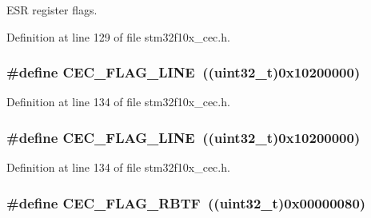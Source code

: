 E\+SR register flags. 



Definition at line 129 of file stm32f10x\+\_\+cec.\+h.

\subsubsection[{\texorpdfstring{C\+E\+C\+\_\+\+F\+L\+A\+G\+\_\+\+L\+I\+NE}{CEC_FLAG_LINE}}]{\setlength{\rightskip}{0pt plus 5cm}\#define C\+E\+C\+\_\+\+F\+L\+A\+G\+\_\+\+L\+I\+NE~(({\bf uint32\+\_\+t})0x10200000)}\hypertarget{group___c_e_c__flags__definition_gaf751970725df12976dc6c8356910143a}{}\label{group___c_e_c__flags__definition_gaf751970725df12976dc6c8356910143a}


Definition at line 134 of file stm32f10x\+\_\+cec.\+h.

\subsubsection[{\texorpdfstring{C\+E\+C\+\_\+\+F\+L\+A\+G\+\_\+\+L\+I\+NE}{CEC_FLAG_LINE}}]{\setlength{\rightskip}{0pt plus 5cm}\#define C\+E\+C\+\_\+\+F\+L\+A\+G\+\_\+\+L\+I\+NE~(({\bf uint32\+\_\+t})0x10200000)}\hypertarget{group___c_e_c__flags__definition_gaf751970725df12976dc6c8356910143a}{}\label{group___c_e_c__flags__definition_gaf751970725df12976dc6c8356910143a}


Definition at line 134 of file stm32f10x\+\_\+cec.\+h.

\subsubsection[{\texorpdfstring{C\+E\+C\+\_\+\+F\+L\+A\+G\+\_\+\+R\+B\+TF}{CEC_FLAG_RBTF}}]{\setlength{\rightskip}{0pt plus 5cm}\#define C\+E\+C\+\_\+\+F\+L\+A\+G\+\_\+\+R\+B\+TF~(({\bf uint32\+\_\+t})0x00000080)}\hypertarget{group___c_e_c__flags__definition_gae73c6ec73ab8ad57b18d3bd416baf2d3}{}\label{group___c_e_c__flags__definition_gae73c6ec73ab8ad57b18d3bd416baf2d3}


